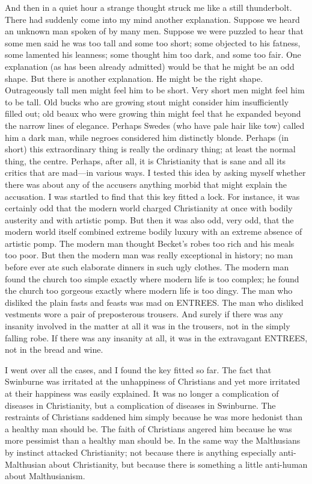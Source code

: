 And then in a quiet hour a strange thought struck me like a still thunderbolt. There had suddenly come into my mind another explanation. Suppose we heard an unknown man spoken of by many men. Suppose we were puzzled to hear that some men said he was too tall and some too short; some objected to his fatness, some lamented his leanness; some thought him too dark, and some too fair. One explanation (as has been already admitted) would be that he might be an odd shape. But there is another explanation. He might be the right shape. Outrageously tall men might feel him to be short. Very short men might feel him to be tall. Old bucks who are growing stout might consider him insufficiently filled out; old beaux who were growing thin might feel that he expanded beyond the narrow lines of elegance. Perhaps Swedes (who have pale hair like tow) called him a dark man, while negroes considered him distinctly blonde. Perhaps (in short) this extraordinary thing is really the ordinary thing; at least the normal thing, the centre. Perhaps, after all, it is Christianity that is sane and all its critics that are mad—in various ways. I tested this idea by asking myself whether there was about any of the accusers anything morbid that might explain the accusation. I was startled to find that this key fitted a lock. For instance, it was certainly odd that the modern world charged Christianity at once with bodily austerity and with artistic pomp. But then it was also odd, very odd, that the modern world itself combined extreme bodily luxury with an extreme absence of artistic pomp. The modern man thought Becket’s robes too rich and his meals too poor. But then the modern man was really exceptional in history; no man before ever ate such elaborate dinners in such ugly clothes. The modern man found the church too simple exactly where modern life is too complex; he found the church too gorgeous exactly where modern life is too dingy. The man who disliked the plain fasts and feasts was mad on ENTREES. The man who disliked vestments wore a pair of preposterous trousers. And surely if there was any insanity involved in the matter at all it was in the trousers, not in the simply falling robe. If there was any insanity at all, it was in the extravagant ENTREES, not in the bread and wine.

I went over all the cases, and I found the key fitted so far. The fact that Swinburne was irritated at the unhappiness of Christians and yet more irritated at their happiness was easily explained. It was no longer a complication of diseases in Christianity, but a complication of diseases in Swinburne. The restraints of Christians saddened him simply because he was more hedonist than a healthy man should be. The faith of Christians angered him because he was more pessimist than a healthy man should be. In the same way the Malthusians by instinct attacked Christianity; not because there is anything especially anti-Malthusian about Christianity, but because there is something a little anti-human about Malthusianism.

